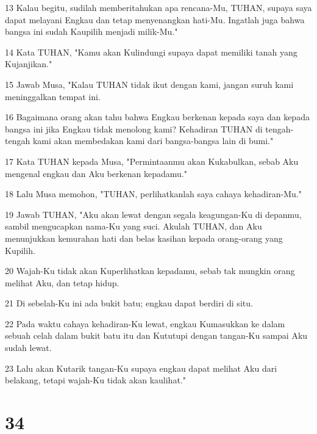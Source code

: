 \par 13 Kalau begitu, sudilah memberitahukan apa rencana-Mu, TUHAN, supaya saya dapat melayani Engkau dan tetap menyenangkan hati-Mu. Ingatlah juga bahwa bangsa ini sudah Kaupilih menjadi milik-Mu."
\par 14 Kata TUHAN, "Kamu akan Kulindungi supaya dapat memiliki tanah yang Kujanjikan."
\par 15 Jawab Musa, "Kalau TUHAN tidak ikut dengan kami, jangan suruh kami meninggalkan tempat ini.
\par 16 Bagaimana orang akan tahu bahwa Engkau berkenan kepada saya dan kepada bangsa ini jika Engkau tidak menolong kami? Kehadiran TUHAN di tengah-tengah kami akan membedakan kami dari bangsa-bangsa lain di bumi."
\par 17 Kata TUHAN kepada Musa, "Permintaanmu akan Kukabulkan, sebab Aku mengenal engkau dan Aku berkenan kepadamu."
\par 18 Lalu Musa memohon, "TUHAN, perlihatkanlah saya cahaya kehadiran-Mu."
\par 19 Jawab TUHAN, "Aku akan lewat dengan segala keagungan-Ku di depanmu, sambil mengucapkan nama-Ku yang suci. Akulah TUHAN, dan Aku menunjukkan kemurahan hati dan belas kasihan kepada orang-orang yang Kupilih.
\par 20 Wajah-Ku tidak akan Kuperlihatkan kepadamu, sebab tak mungkin orang melihat Aku, dan tetap hidup.
\par 21 Di sebelah-Ku ini ada bukit batu; engkau dapat berdiri di situ.
\par 22 Pada waktu cahaya kehadiran-Ku lewat, engkau Kumasukkan ke dalam sebuah celah dalam bukit batu itu dan Kututupi dengan tangan-Ku sampai Aku sudah lewat.
\par 23 Lalu akan Kutarik tangan-Ku supaya engkau dapat melihat Aku dari belakang, tetapi wajah-Ku tidak akan kaulihat."

\chapter{34}

